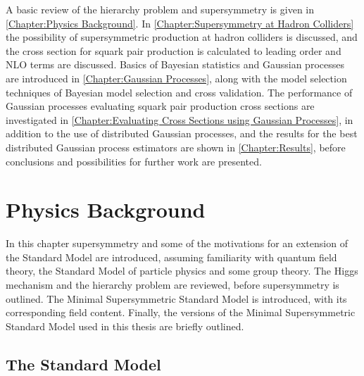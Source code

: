 \documentclass[twoside,english]{uiofysmaster}
\makeatletter
\newenvironment{chapquote}[2][2em]
  {\setlength{\@tempdima}{#1}%
   \def\chapquote@author{#2}%
   \parshape 1 \@tempdima \dimexpr\textwidth-2\@tempdima\relax%
   \itshape}
  {\par\normalfont\hfill--\ \chapquote@author\hspace*{\@tempdima}\par\bigskip}
\makeatother
\begin{document}
A basic review of the hierarchy problem and supersymmetry is given in \autoref{Chapter:Physics Background}. In \autoref{Chapter:Supersymmetry at Hadron Colliders} the possibility of supersymmetric production at hadron colliders is discussed, and the cross section for squark pair production is calculated to leading order and NLO terms are discussed. Basics of Bayesian statistics and Gaussian processes are introduced in \autoref{Chapter:Gaussian Processes}, along with the model selection techniques of Bayesian model selection and cross validation. The performance of Gaussian processes evaluating squark pair production cross sections are investigated in \autoref{Chapter:Evaluating Cross Sections using Gaussian Processes}, in addition to the use of distributed Gaussian processes, and the results for the best distributed Gaussian process estimators are shown in \autoref{Chapter:Results}, before conclusions and possibilities for further work are presented.





\chapter{Physics Background}\label{Chapter:Physics Background}

 

In this chapter supersymmetry and some of the motivations for an extension of the Standard Model are introduced, assuming familiarity with quantum field theory, the Standard Model of particle physics and some group theory. The Higgs mechanism and the hierarchy problem are reviewed, before supersymmetry is outlined. The Minimal Supersymmetric Standard Model is introduced, with its corresponding field content. Finally, the versions of the Minimal Supersymmetric Standard Model used in this thesis are briefly outlined.

\section{The Standard Model}
\end{document}

